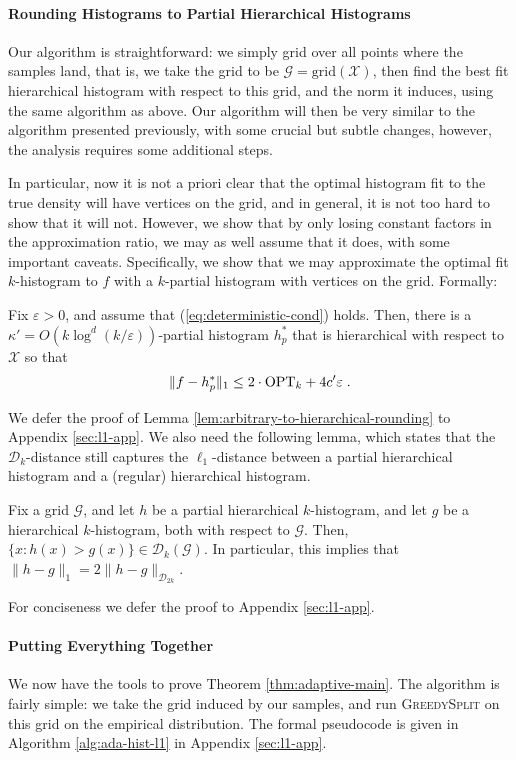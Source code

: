 \documentclass[final,12pt]{colt2018} %
\newcommand{\eps}{\varepsilon}
\newcommand{\hier}{\mathcal{D}}
\newcommand{\calX}{\mathcal{X}}
\newcommand{\calG}{\mathcal{G}}
\newcommand{\grid}{\mathrm{grid}}
\begin{document}
\paragraph{Rounding Histograms to Partial Hierarchical Histograms}
Our algorithm is straightforward: we simply grid over all points 
where the samples land, that is, we take the grid to be $\calG = \grid (\calX)$, 
then find the best fit hierarchical histogram with respect to this grid, 
and the norm it induces, using the same algorithm as above.
Our algorithm will then be very similar to the algorithm presented previously, 
with some crucial but subtle changes, however, the analysis requires some additional steps.

In particular, now it is not a priori clear that the optimal histogram 
fit to the true density will have vertices on the grid, and in general, 
it is not too hard to show that it will not.
However, we show that by only losing constant factors in the approximation ratio, 
we may as well assume that it does, with some important caveats.
Specifically, we show that we may approximate the optimal fit $k$-histogram 
to $f$ with a $k$-partial histogram with vertices on the grid.
Formally:
\begin{lemma}
\label{lem:arbitrary-to-hierarchical-rounding}
Fix $\eps > 0$, and assume that (\ref{eq:deterministic-cond}) holds.
Then, there is a $\kappa' = O(k \log^d (k / \eps))$-partial histogram $h_p^*$ that is hierarchical with respect to $\calX$ so that 
\begin{equation}
\label{eq:arbitrary-to-hierarchical}
\| f - h^*_p \|_1 \leq 2 \cdot \OPT_k + 4 c' \eps \; .
\end{equation}
\end{lemma}
We defer the proof of Lemma \ref{lem:arbitrary-to-hierarchical-rounding} to Appendix \ref{sec:l1-app}.
We also need the following lemma, which states that the $\hier_k$-distance 
still captures the $\ell_1$-distance between a partial hierarchical histogram 
and a (regular) hierarchical histogram.
\begin{lemma}
\label{lem:partial-minus-full}
Fix a grid $\calG$, and let $h$ be a partial hierarchical $k$-histogram, 
and let $g$ be a hierarchical $k$-histogram, both with respect to $\calG$.
Then, $\{x: h(x) > g(x)\} \in \hier_k (\calG)$.
In particular, this implies that $\| h - g \|_1 = 2 \| h - g \|_{\hier_{2k}}$.
\end{lemma}
For conciseness we defer the proof to Appendix \ref{sec:l1-app}.

\paragraph{Putting Everything Together}
We now have the tools to prove Theorem \ref{thm:adaptive-main}.
The algorithm is fairly simple: we take the grid induced by our samples, 
and run \textsc{GreedySplit} on this grid on the empirical distribution.
The formal pseudocode is given in Algorithm \ref{alg:ada-hist-l1} in Appendix \ref{sec:l1-app}.
\end{document}
